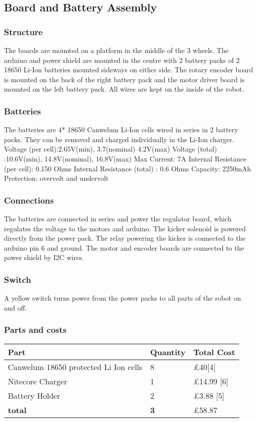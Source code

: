 \subsection{Board and Battery Assembly}
\subsubsection{Structure}
The boards are mounted on a platform in the middle of the 3 wheels. The arduino and power
shield are mounted in the centre with 2 battery packs of 2 18650 Li-Ion batteries mounted sideways on either side. The rotary encoder board is
mounted on the back of the right battery pack and the motor driver board is mounted
on the left battery pack. All wires are kept on the inside of the robot.

\subsubsection{Batteries}
The batteries are 4* 18650 Canwelum Li-Ion cells wired in series in 2 battery packs. They can be removed and charged individually in the Li-Ion charger.
	Voltage (per cell):2.65V(min), 3.7(nominal) 4.2V(max)
    Voltage (total)   :10.6V(min), 14.8V(nominal), 16.8V(max)
    Max Current: 7A
    Internal Resistance (per cell): 0.150 Ohms
    Internal Resistance (total)   : 0.6   Ohms
    Capacity: 2250mAh
	Protection: overvolt and undervolt   
    
\subsubsection{Connections}
The batteries are connected in series and power the regulator board, which regulates the voltage to the motors and arduino. The kicker solenoid is powered directly from the power pack. The relay powering the kicker is connected to the arduino pin 6 and ground. The motor and encoder boards are connected to the power shield by I2C wires. 
\subsubsection{Switch}
A yellow switch turns power from the power packs to all parts of the robot on and off.

\subsubsection{Parts and costs}
\begin{center}
\begin{tabular}{ | m{3cm} | m{3cm}| m{6cm} | }
\hline
\textbf{Part} & \textbf{Quantity} & \textbf{Total Cost} \\
\hline
Canwelum 18650 protected Li Ion cells & 8 &  £40[4] \\
\hline
Nitecore Charger & 1 & £14.99 [6]\\
\hline
Battery Holder & 2 & £3.88 [5]\\
\hline
\textbf{total} & \textbf{3} & £58.87 \\
\hline
\end{tabular}
\end{center}

